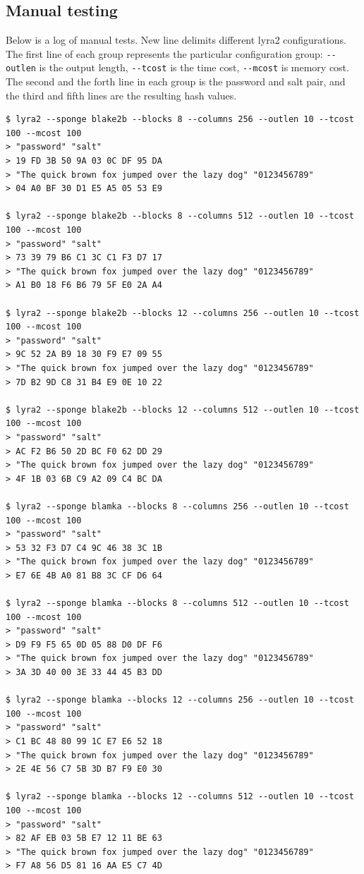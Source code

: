 \subsection{Manual testing}
\label{sec:manual-testing}

Below is a log of manual tests. New line delimits different lyra2 configurations. The first line of each group represents the particular configuration group: \verb|--outlen| is the output length, \verb|--tcost| is the time cost, \verb|--mcost| is memory cost. The second and the forth line in each group is the password and salt pair, and the third and fifth lines are the resulting hash values.

\tiny
\begin{verbatim}
$ lyra2 --sponge blake2b --blocks 8 --columns 256 --outlen 10 --tcost 100 --mcost 100
> "password" "salt"
> 19 FD 3B 50 9A 03 0C DF 95 DA
> "The quick brown fox jumped over the lazy dog" "0123456789"
> 04 A0 BF 30 D1 E5 A5 05 53 E9

$ lyra2 --sponge blake2b --blocks 8 --columns 512 --outlen 10 --tcost 100 --mcost 100
> "password" "salt"
> 73 39 79 B6 C1 3C C1 F3 D7 17
> "The quick brown fox jumped over the lazy dog" "0123456789"
> A1 B0 18 F6 B6 79 5F E0 2A A4

$ lyra2 --sponge blake2b --blocks 12 --columns 256 --outlen 10 --tcost 100 --mcost 100
> "password" "salt"
> 9C 52 2A B9 18 30 F9 E7 09 55
> "The quick brown fox jumped over the lazy dog" "0123456789"
> 7D B2 9D C8 31 B4 E9 0E 10 22

$ lyra2 --sponge blake2b --blocks 12 --columns 512 --outlen 10 --tcost 100 --mcost 100
> "password" "salt"
> AC F2 B6 50 2D BC F0 62 DD 29
> "The quick brown fox jumped over the lazy dog" "0123456789"
> 4F 1B 03 6B C9 A2 09 C4 BC DA

$ lyra2 --sponge blamka --blocks 8 --columns 256 --outlen 10 --tcost 100 --mcost 100
> "password" "salt"
> 53 32 F3 D7 C4 9C 46 38 3C 1B
> "The quick brown fox jumped over the lazy dog" "0123456789"
> E7 6E 4B A0 81 B8 3C CF D6 64

$ lyra2 --sponge blamka --blocks 8 --columns 512 --outlen 10 --tcost 100 --mcost 100
> "password" "salt"
> D9 F9 F5 65 0D 05 88 D0 DF F6
> "The quick brown fox jumped over the lazy dog" "0123456789"
> 3A 3D 40 00 3E 33 44 45 B3 DD

$ lyra2 --sponge blamka --blocks 12 --columns 256 --outlen 10 --tcost 100 --mcost 100
> "password" "salt"
> C1 BC 48 80 99 1C E7 E6 52 18
> "The quick brown fox jumped over the lazy dog" "0123456789"
> 2E 4E 56 C7 5B 3D B7 F9 E0 30

$ lyra2 --sponge blamka --blocks 12 --columns 512 --outlen 10 --tcost 100 --mcost 100
> "password" "salt"
> 82 AF EB 03 5B E7 12 11 BE 63
> "The quick brown fox jumped over the lazy dog" "0123456789"
> F7 A8 56 D5 81 16 AA E5 C7 4D
\end{verbatim}
\normalsize

